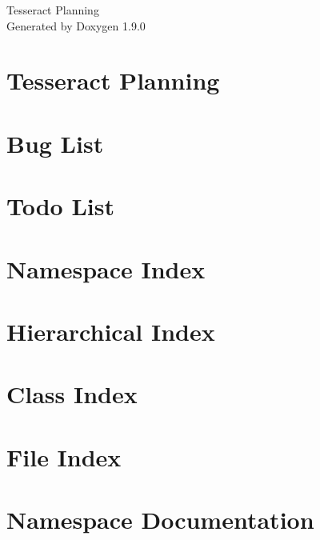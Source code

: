 \let\mypdfximage\pdfximage\def\pdfximage{\immediate\mypdfximage}\documentclass[twoside]{book}
\newcommand{\+}{\discretionary{\mbox{\scriptsize$\hookleftarrow$}}{}{}}
\newcommand{\clearemptydoublepage}{%
  \newpage{\pagestyle{empty}\cleardoublepage}%
}
\begin{document}
\raggedbottom

\hypersetup{pageanchor=false,
             bookmarksnumbered=true,
             pdfencoding=unicode
            }
\begin{titlepage}
\vspace*{7cm}
\begin{center}%
{\Large Tesseract Planning }\\
\vspace*{1cm}
{\large Generated by Doxygen 1.9.0}\\
\end{center}
\end{titlepage}
\clearemptydoublepage
{}
\tableofcontents
\clearemptydoublepage
{}
\hypersetup{pageanchor=true}

\chapter{Tesseract Planning}
\label{index}\hypertarget{index}{}
\chapter{Bug List}
\label{bug}

\chapter{Todo List}
\label{todo}

\chapter{Namespace Index}

\chapter{Hierarchical Index}

\chapter{Class Index}

\chapter{File Index}

\chapter{Namespace Documentation}







\end{document}
